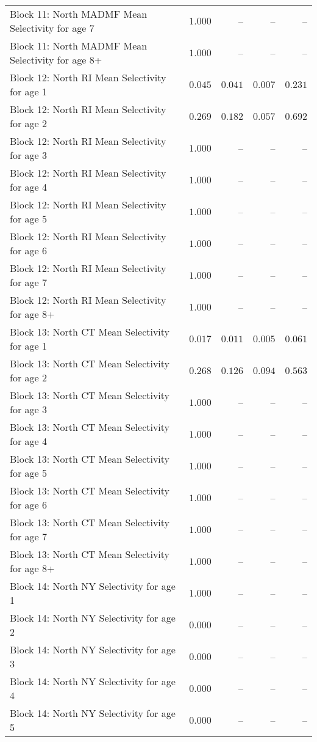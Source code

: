 \documentclass[
]{article}
\begin{document}
\begin{landscape}
\begin{longtable}[t]{lrrrr}
Block 11: North MADMF Mean Selectivity for age 7 & $1.000$ & -- & -- & --\\
Block 11: North MADMF Mean Selectivity for age 8+ & $1.000$ & -- & -- & --\\
Block 12: North RI Mean Selectivity for age 1 & $0.045$ & $0.041$ & $0.007$ & $0.231$\\
\addlinespace
Block 12: North RI Mean Selectivity for age 2 & $0.269$ & $0.182$ & $0.057$ & $0.692$\\
Block 12: North RI Mean Selectivity for age 3 & $1.000$ & -- & -- & --\\
Block 12: North RI Mean Selectivity for age 4 & $1.000$ & -- & -- & --\\
Block 12: North RI Mean Selectivity for age 5 & $1.000$ & -- & -- & --\\
Block 12: North RI Mean Selectivity for age 6 & $1.000$ & -- & -- & --\\
\addlinespace
Block 12: North RI Mean Selectivity for age 7 & $1.000$ & -- & -- & --\\
Block 12: North RI Mean Selectivity for age 8+ & $1.000$ & -- & -- & --\\
Block 13: North CT Mean Selectivity for age 1 & $0.017$ & $0.011$ & $0.005$ & $0.061$\\
Block 13: North CT Mean Selectivity for age 2 & $0.268$ & $0.126$ & $0.094$ & $0.563$\\
Block 13: North CT Mean Selectivity for age 3 & $1.000$ & -- & -- & --\\
\addlinespace
Block 13: North CT Mean Selectivity for age 4 & $1.000$ & -- & -- & --\\
Block 13: North CT Mean Selectivity for age 5 & $1.000$ & -- & -- & --\\
Block 13: North CT Mean Selectivity for age 6 & $1.000$ & -- & -- & --\\
Block 13: North CT Mean Selectivity for age 7 & $1.000$ & -- & -- & --\\
Block 13: North CT Mean Selectivity for age 8+ & $1.000$ & -- & -- & --\\
\addlinespace
Block 14: North NY Selectivity for age 1 & $1.000$ & -- & -- & --\\
Block 14: North NY Selectivity for age 2 & $0.000$ & -- & -- & --\\
Block 14: North NY Selectivity for age 3 & $0.000$ & -- & -- & --\\
Block 14: North NY Selectivity for age 4 & $0.000$ & -- & -- & --\\
Block 14: North NY Selectivity for age 5 & $0.000$ & -- & -- & --\\

\end{longtable}
\end{landscape}
\end{document}
